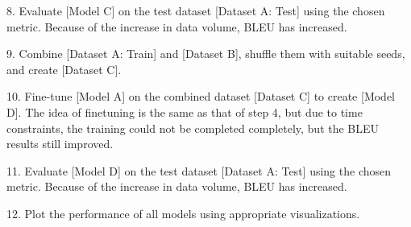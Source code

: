 8. Evaluate [Model C] on the test dataset [Dataset A: Test] using the chosen metric.
Because of the increase in data volume, BLEU has increased.

9. Combine [Dataset A: Train] and [Dataset B], shuffle them with suitable seeds, and create [Dataset C].

10. Fine-tune [Model A] on the combined dataset [Dataset C] to create [Model D].
The idea of fine\-tuning is the same as that of step 4, but due to time constraints, 
the training could not be completed completely, but the BLEU results still improved.

11. Evaluate [Model D] on the test dataset [Dataset A: Test] using the chosen metric.
Because of the increase in data volume, BLEU has increased.

12. Plot the performance of all models using appropriate visualizations.

